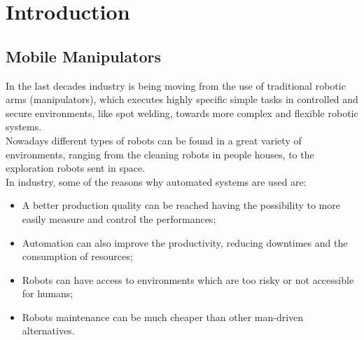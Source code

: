 \chapter{Introduction}
\label{chapter1}

\section{Mobile Manipulators}

In the last decades industry is being moving from the use of traditional robotic arms (manipulators), which executes highly specific simple tasks in controlled and secure environments, like spot welding, towards more complex and flexible robotic systems. \\ Nowadays different types of robots can be found in a great variety of environments, ranging from the cleaning robots in people houses, to the exploration robots sent in space.\\
In industry, some of the reasons why automated systems are used are:
\begin{itemize}
	\item A better production quality can be reached having the possibility to more easily measure and control the performances;
	\item Automation can also improve the productivity, reducing downtimes and the consumption of resources;
	\item Robots can have access to environments which are too risky or not accessible for humans;
	\item Robots maintenance can be much cheaper than other man-driven alternatives. 
\end{itemize}

